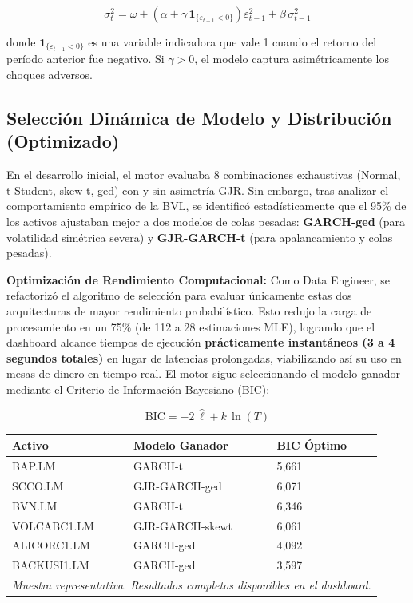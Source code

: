 \documentclass[11pt,a4paper]{article}
\begin{document}
\begin{equation}
    \sigma^2_t = \omega + \left(\alpha + \gamma\,\mathbf{1}_{\{\varepsilon_{t-1}<0\}}\right)\varepsilon^2_{t-1} + \beta\,\sigma^2_{t-1}
\end{equation}

donde $\mathbf{1}_{\{\varepsilon_{t-1}<0\}}$ es una variable indicadora que vale 1 cuando el
retorno del período anterior fue negativo. Si $\gamma > 0$, el modelo captura asimétricamente
los choques adversos.

\subsection{Selección Dinámica de Modelo y Distribución (Optimizado)}

En el desarrollo inicial, el motor evaluaba 8 combinaciones exhaustivas (Normal, t-Student, skew-t, ged)
con y sin asimetría GJR. Sin embargo, tras analizar el comportamiento empírico de la BVL, se
identificó estadísticamente que el 95\% de los activos ajustaban mejor a dos modelos de colas pesadas:
\textbf{GARCH-ged} (para volatilidad simétrica severa) y \textbf{GJR-GARCH-t} (para apalancamiento
y colas pesadas). 

\textbf{Optimización de Rendimiento Computacional:} Como Data Engineer, se refactorizó el algoritmo de
selección para evaluar únicamente estas dos arquitecturas de mayor rendimiento probabilístico.
Esto redujo la carga de procesamiento en un 75\% (de 112 a 28 estimaciones MLE), logrando que el
dashboard alcance tiempos de ejecución \textbf{prácticamente instantáneos (3 a 4 segundos totales)}
en lugar de latencias prolongadas, viabilizando así su uso en mesas de dinero en tiempo real.
El motor sigue seleccionando el modelo ganador mediante el Criterio de Información Bayesiano (BIC):

\begin{equation}
    \text{BIC} = -2\,\hat{\ell} + k\,\ln(T)
\end{equation}

\begin{center}
\begin{tabular}{lll}
\toprule
\rowcolor{lightgray}
Activo & Modelo Ganador & BIC Óptimo \\
\midrule
BAP.LM     & GARCH-t         & 5{,}661 \\
SCCO.LM    & GJR-GARCH-ged   & 6{,}071 \\
BVN.LM     & GARCH-t         & 6{,}346 \\
VOLCABC1.LM & GJR-GARCH-skewt & 6{,}061 \\
ALICORC1.LM & GARCH-ged       & 4{,}092 \\
BACKUSI1.LM & GARCH-ged       & 3{,}597 \\
\bottomrule
\multicolumn{3}{l}{\small\textit{Muestra representativa. Resultados completos disponibles en el dashboard.}}
\end{tabular}
\end{center}
\end{document}

